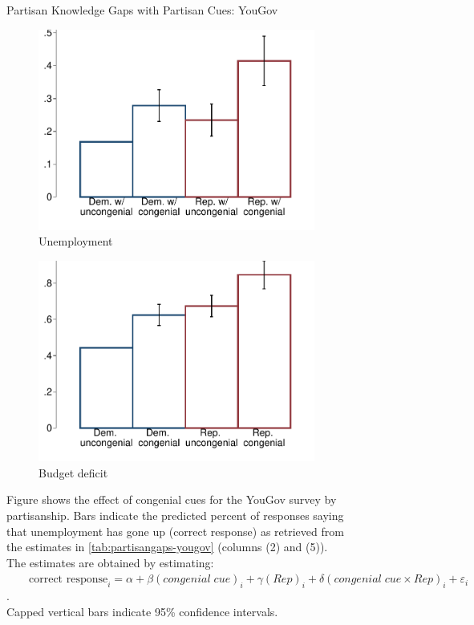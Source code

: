 \begin{figure}[ht]
	\caption{Partisan Knowledge Gaps with Partisan Cues: YouGov}
	\centering
	\begin{subfigure}{.495\textwidth}\centering
		\includegraphics[width=\textwidth]{../figs/yougov-unemp-congenialcue-partisan.pdf}
		\caption{Unemployment}
	\end{subfigure}
	\hfil
	\begin{subfigure}{.495\textwidth}\centering
		\includegraphics[width=\textwidth]{../figs/yougov-deficit-congenialcue-partisan.pdf}
		\caption{Budget deficit}
	\end{subfigure}
	\caption*{\footnotesize Figure shows the effect of congenial cues for the YouGov survey by partisanship. Bars indicate the predicted percent of responses saying that unemployment has gone up (correct response) as retrieved from the estimates in \cref{tab:partisangaps-yougov} (columns (2) and (5)).  The estimates are obtained by estimating:\\

	$\qquad\text{correct response}_{i} = \alpha + \beta (congenial \; cue)_i + \gamma (Rep)_i + \delta (congenial\; cue \times Rep)_i + \varepsilon_{i}$.\\

	Capped vertical bars indicate 95\% confidence intervals.
	}
	\label{fig:yougov-reg-by-partisanship}
\end{figure}

